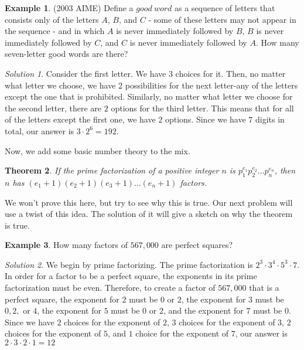 \documentclass[l1pt]{article}
\theoremstyle{plain}
\newtheorem{thm}{Theorem}[section]
\theoremstyle{definition}
\newtheorem{example}[thm]{Example}
\theoremstyle{remark}
\newtheorem*{solution}{Solution}
\begin{document}
\begin{example}
(2003 AIME) Define a $good~word$ as a sequence of letters that consists only of the letters $A$, $B$, and $C$ - some of these letters may not appear in the sequence - and in which $A$ is never immediately followed by $B$, $B$ is never immediately followed by $C$, and $C$ is never immediately followed by $A$. How many seven-letter good words are there?
\end{example}

\begin{solution}
Consider the first letter. We have $3$ choices for it. Then, no matter what letter we choose, we have $2$ possibilities for the next letter-any of the letters except the one that is prohibited. Similarly, no matter what letter we choose for the second letter, there are $2$ options for the third letter. This means that for all of the letters except the first one, we have $2$ options. Since we have $7$ digits in total, our answer is $3\cdot 2^6=192.$
\end{solution}


Now, we add some basic number theory to the mix. 

\begin{mdframed}
\begin{thm}
If the prime factorization of a positive integer $n$ is $p_1^{e_1}p_2^{e_2} \dots p_n^{e_n}$, then $n$ has $(e_1+1)(e_2+1)(e_3+1)\dots (e_n+1)$ factors.
\end{thm}
\end{mdframed}

We won't prove this here, but try to see why this is true. Our next problem will use a twist of this idea. The solution of it will give a sketch on why the theorem is true.
\begin{example}
How many factors of $567,000$ are perfect squares?
\end{example}

\begin{solution}
We begin by prime factorizing. The prime factorization is $2^3\cdot 3^4 \cdot 5^3 \cdot 7$. In order for a factor to be a perfect square, the exponents in its prime factorization must be even. Therefore, to create a factor of $567,000$ that is a perfect square, the exponent for $2$ must be $0$ or $2$, the exponent for $3$ must be $0,2,$ or $4$, the exponent for $5$ must be $0$ or $2$, and the exponent for $7$ must be $0$. Since we have $2$ choices for the exponent of $2$, $3$ choices for the exponent of $3$, $2$ choices for the exponent of $5$, and $1$ choice for the exponent of $7$, our answer is $2\cdot 3\cdot 2 \cdot 1=12$
\end{solution}
\end{document}
